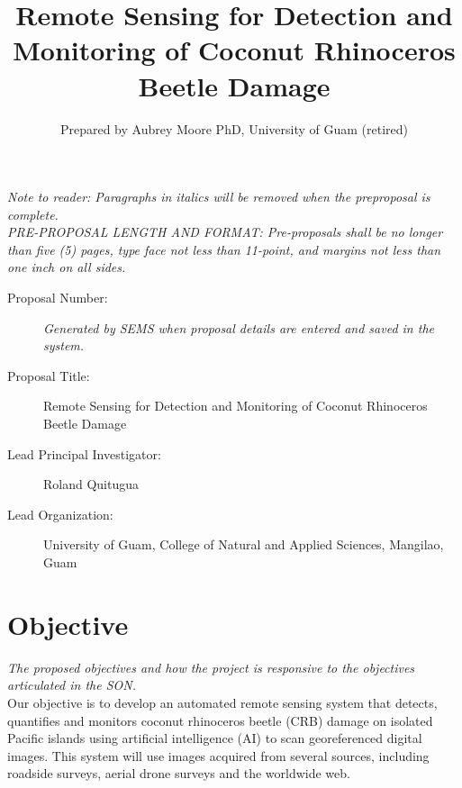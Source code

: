 \documentclass[11pt,english,letterpaper]{scrartcl}
\begin{document}
\titlehead{DRAFT SERDP FY25 PREPROPOSAL}
\title{Remote Sensing for Detection and Monitoring of Coconut Rhinoceros Beetle Damage}
\author{Prepared by Aubrey Moore PhD, University of Guam (retired)}

\maketitle

\tableofcontents{}\clearpage{}

\textit{Note to reader: Paragraphs in italics will be removed when the preproposal is complete.} \\

\textit{PRE-PROPOSAL LENGTH AND FORMAT: 
Pre-proposals shall be no longer than five (5) pages, type face not less than 11-point, and margins not less than one inch on all sides.} 

\begin{description}
	
\item[Proposal Number:] \emph{Generated by SEMS when proposal details are entered and saved in the system.}

\item[Proposal Title:] Remote Sensing for Detection and Monitoring of Coconut Rhinoceros Beetle Damage

\item[Lead Principal Investigator:] Roland Quitugua

\item[Lead Organization:] University of Guam, College of Natural and Applied Sciences, Mangilao, Guam

\end{description}


\section{Objective}

\textit{The proposed objectives and how the project is responsive to the objectives
	articulated in the SON.}\\
	
Our objective is to develop an automated remote sensing system that detects, quantifies and monitors coconut rhinoceros beetle (CRB) damage on isolated Pacific islands using artificial intelligence (AI) to scan georeferenced digital images. This system will use images acquired from several sources, including roadside surveys, aerial drone surveys and the worldwide web.
\end{document}

